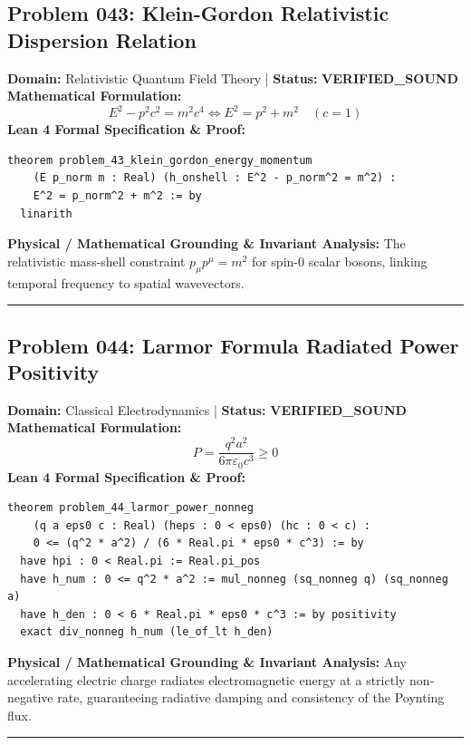 \documentclass[10pt,a4paper]{article}
\begin{document}
\subsection*{Problem 043: Klein-Gordon Relativistic Dispersion Relation}
\textbf{Domain:} Relativistic Quantum Field Theory \quad | \quad \textbf{Status:} \textcolor{green!70!black}{\textbf{VERIFIED\_SOUND}}\\
\textbf{Mathematical Formulation:}
\begin{equation*}
  E^2 - p^2 c^2 = m^2 c^4 \iff E^2 = p^2 + m^2 \quad (c=1)
\end{equation*}
\textbf{Lean 4 Formal Specification \& Proof:}
\begin{lstlisting}
theorem problem_43_klein_gordon_energy_momentum
    (E p_norm m : Real) (h_onshell : E^2 - p_norm^2 = m^2) :
    E^2 = p_norm^2 + m^2 := by
  linarith
\end{lstlisting}
\textbf{Physical / Mathematical Grounding \& Invariant Analysis:}
The relativistic mass-shell constraint $p_\mu p^\mu = m^2$ for spin-0 scalar bosons, linking temporal frequency to spatial wavevectors.
\vspace{0.8em}\hrule\vspace{0.8em}
\subsection*{Problem 044: Larmor Formula Radiated Power Positivity}
\textbf{Domain:} Classical Electrodynamics \quad | \quad \textbf{Status:} \textcolor{green!70!black}{\textbf{VERIFIED\_SOUND}}\\
\textbf{Mathematical Formulation:}
\begin{equation*}
  P = \frac{q^2 a^2}{6\pi \varepsilon_0 c^3} \ge 0
\end{equation*}
\textbf{Lean 4 Formal Specification \& Proof:}
\begin{lstlisting}
theorem problem_44_larmor_power_nonneg
    (q a eps0 c : Real) (heps : 0 < eps0) (hc : 0 < c) :
    0 <= (q^2 * a^2) / (6 * Real.pi * eps0 * c^3) := by
  have hpi : 0 < Real.pi := Real.pi_pos
  have h_num : 0 <= q^2 * a^2 := mul_nonneg (sq_nonneg q) (sq_nonneg a)
  have h_den : 0 < 6 * Real.pi * eps0 * c^3 := by positivity
  exact div_nonneg h_num (le_of_lt h_den)
\end{lstlisting}
\textbf{Physical / Mathematical Grounding \& Invariant Analysis:}
Any accelerating electric charge radiates electromagnetic energy at a strictly non-negative rate, guaranteeing radiative damping and consistency of the Poynting flux.
\vspace{0.8em}\hrule\vspace{0.8em}
\end{document}
